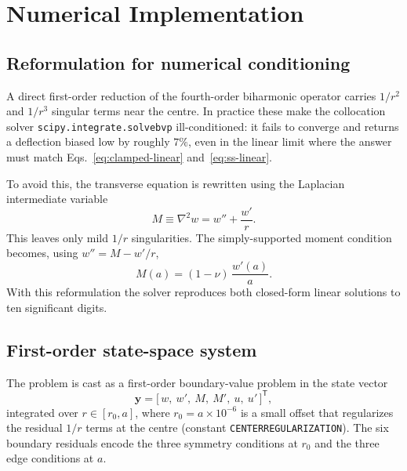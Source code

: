 \documentclass[11pt]{article}
\newcommand{\codeus}{\textunderscore\allowbreak}
\DeclareRobustCommand{\code}[1]{\texttt{\ifmmode\else\renewcommand{\_}{\codeus}\fi#1}}
\begin{document}
\section{Numerical Implementation}

\subsection{Reformulation for numerical conditioning}

A direct first-order reduction of the fourth-order biharmonic operator carries
$1/r^{2}$ and $1/r^{3}$ singular terms near the centre. In practice these make the
collocation solver \code{scipy.integrate.solve\_bvp} ill-conditioned: it fails to
converge and returns a deflection biased low by roughly $7\%$, even in the linear
limit where the answer must match Eqs.~\eqref{eq:clamped-linear}
and~\eqref{eq:ss-linear}.

To avoid this, the transverse equation is rewritten using the Laplacian
intermediate variable
%
\begin{equation}
  M \equiv \nabla^{2} w = w'' + \frac{w'}{r}.
\end{equation}
%
This leaves only mild $1/r$ singularities. The simply-supported moment condition
becomes, using $w'' = M - w'/r$,
%
\begin{equation}
  M(a) = (1-\nu)\,\frac{w'(a)}{a}.
\end{equation}
%
With this reformulation the solver reproduces both closed-form linear solutions to
ten significant digits.

\subsection{First-order state-space system}

The problem is cast as a first-order boundary-value problem in the state vector
%
\begin{equation}
  \mathbf{y} = \bigl[\, w,\ w',\ M,\ M',\ u,\ u' \,\bigr]^{\mathsf{T}},
\end{equation}
%
integrated over $r \in [r_{0}, a]$, where $r_{0} = a \times 10^{-6}$ is a small
offset that regularizes the residual $1/r$ terms at the centre (constant
\code{CENTER\_REGULARIZATION}). The six boundary residuals encode the three
symmetry conditions at $r_0$ and the three edge conditions at $a$.
\end{document}
